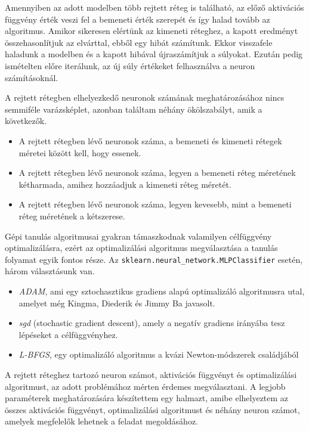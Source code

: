 Amennyiben az adott modelben több rejtett réteg is található, az előző aktivációs függvény érték veszi fel a bemeneti érték szerepét és így halad tovább az algoritmus. Amikor sikeresen elértünk az kimeneti réteghez, a kapott eredményt összehasonlítjuk az elvárttal, ebből egy hibát számítunk.
Ekkor visszafele haladunk a modelben és a kapott hibával újraszámítjuk a súlyokat.
Ezután pedig ismételten előre iterálunk, az új súly értékeket felhasználva a neuron számításoknál.

A rejtett rétegben elhelyezkedő neuronok számának meghatározásához nincs semmiféle varázsképlet, azonban találtam néhány ökölszabályt, amik a következők. 
\begin{itemize}
\item A rejtett rétegben lévő neuronok száma, a bemeneti és kimeneti rétegek méretei között kell, hogy essenek.
\item A rejtett rétegben lévő neuronok száma, legyen a bemeneti réteg méretének kétharmada, amihez hozzáadjuk a kimeneti réteg méretét.
\item A rejtett rétegben lévő neuronok száma, legyen kevesebb, mint a bemeneti réteg méretének a kétszerese.
\end{itemize}

Gépi tanulás algoritmusai gyakran támaszkodnak valamilyen célfüggvény optimalizálásra, ezért az optimalizálási algoritmus megválasztása a tanulás folyamat egyik fontos része.
Az \texttt{sklearn.neural\_network.MLPClassifier} esetén, három választásunk van.
\begin{itemize}
\item \textit{ADAM}, ami egy sztochasztikus gradiens alapú optimalizáló algoritmusra utal, amelyet még Kingma, Diederik és Jimmy Ba javasolt.
\item \textit{sgd} (stochastic gradient descent), amely a negatív gradiens irányába tesz lépéseket a célfüggvényhez.
\item \textit{L-BFGS}, egy  optimalizáló algoritmus a kvázi Newton-módszerek családjából
\end{itemize}

A rejtett réteghez tartozó neuron számot, aktivációs függvényt és optimalizálási algoritmust, az adott problémához mérten érdemes megválasztani. A legjobb paraméterek meghatározására készítettem egy halmazt, amibe elhelyeztem az összes aktivációs függvényt, optimalizálási algoritmust és néhány neuron számot, amelyek megfelelők lehetnek a feladat megoldásához.

